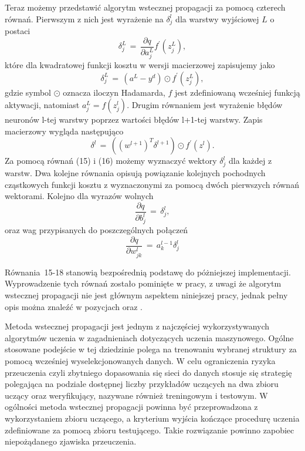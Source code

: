 \par Teraz możemy przedstawić algorytm wstecznej propagacji za pomocą czterech równań. Pierwszym z nich jest wyrażenie na \(\delta_j^l \) dla warstwy wyjściowej \( L \) o postaci 
\begin{equation}
\delta_j^L \, = \, \frac{\partial q}{\partial a_j^L}f^{\prime}(z_j^L),
\end{equation}
które dla kwadratowej funkcji kosztu w wersji macierzowej zapisujemy jako
\begin{equation}
\delta_j^L \, = \, (a^L - y^d)\odot f^{\prime}(z_j^L),
\end{equation}
gdzie symbol \( \odot \) oznacza iloczyn Hadamarda, \( f \) jest zdefiniowaną wcześniej funkcją aktywacji, natomiast \( a_j^L = f(z_j^l) \). 
Drugim równaniem jest wyrażenie błędów neuronów l-tej warstwy poprzez wartości błędów l+1-tej warstwy. Zapis macierzowy wygląda następująco 
\begin{equation}
\delta^l \, = \, ((w^{l+1})^T\delta^{l+1}) \odot f^{\prime}(z^l). 
\end{equation}
Za pomocą równań (15) i (16) możemy wyznaczyć wektory \( \delta_j^l \) dla każdej z warstw. Dwa kolejne równania opisują powiązanie kolejnych pochodnych cząstkowych funkcji kosztu z wyznaczonymi za pomocą dwóch pierwszych równań wektorami. Kolejno dla wyrazów wolnych
\begin{equation}
\frac{\partial q}{\partial b_j^l} \, = \, \delta_j^l , 
\end{equation}
oraz wag przypisanych do poszczególnych połączeń
\begin{equation}
\frac{\partial q}{\partial w_{jk}^l} \, = \, a_k^{l-1}\delta _j^l
\end{equation}
\par Równania~15-18 stanowią bezpośrednią podstawę do póżniejszej implementacji. Wyprowadzenie tych równań zostało pominięte w pracy, z uwagi że algorytm wstecznej propagacji nie jest głównym aspektem niniejszej pracy, jednak pełny opis można znaleźć w pozycjach \cite{osowski2013} oraz \cite{nielsen2015}.
\par Metoda wstecznej propagacji jest jednym z najczęściej wykorzystywanych algorytmów uczenia w zagadnieniach dotyczących uczenia maszynowego. Ogólne stosowane podejście w tej dziedzinie polega na trenowaniu wybranej struktury za pomocą wcześniej wyselekcjonowanych danych. W celu ograniczenia ryzyka przeuczenia czyli zbytniego dopasowania się sieci do danych stosuje się strategię polegająca na podziale dostępnej liczby przykładów uczących na dwa zbioru uczący oraz weryfikujący, nazywane również treningowym i testowym. W ogólności metoda wstecznej propagacji powinna być przeprowadzona z wykorzystaniem zbioru uczącego, a kryterium wyjścia kończące procedurę uczenia zdefiniowane za pomocą zbioru testującego. Takie rozwiązanie powinno zapobiec niepożądanego zjawiska przeuczenia.   


